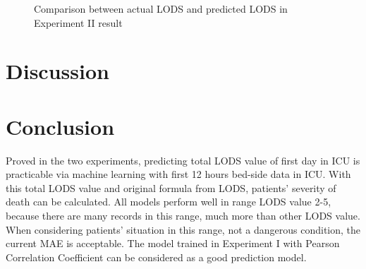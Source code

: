 \documentclass[12pt,a4paper,english
]{tunithesis}
\begin{document}
\begin{figure}
  \begin{center}
    \qquad                        
    \caption[Actual value \& Predicted value]{Comparison between actual LODS and predicted LODS in Experiment II result}

    \label{fig:experiment_2_result}
  \end{center}
\end{figure}

\chapter{Discussion}
\label{ch:discussion}

\chapter{Conclusion}
\label{ch:conclusion}
Proved in the two experiments, predicting total LODS value of first day in ICU is practicable via machine learning with first 12 hours bed-side data in ICU. With this total LODS value and original formula from LODS, patients' severity of death can be calculated. All models perform well in range LODS value 2-5, because there are many records in this range, much more than other LODS value. When considering patients' situation in this range, not a dangerous condition, the current MAE is acceptable. The model trained in Experiment I with Pearson Correlation Coefficient can be considered as a good prediction model.
\end{document}
